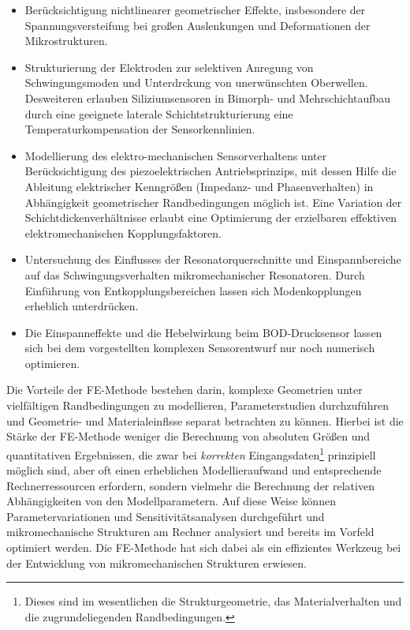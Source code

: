 \begin{itemize}
\item
Berücksichtigung nichtlinearer geometrischer Effekte, insbesondere der
Spannungsversteifung bei großen Auslenkungen und Deformationen der
Mikrostrukturen.
\item
Strukturierung der Elektroden zur selektiven Anregung von Schwingungsmoden
und Unterdrckung von unerwünschten Oberwellen. Desweiteren erlauben
Siliziumsensoren in Bimorph- und Mehrschichtaufbau durch eine geeignete
laterale Schichtstrukturierung eine Temperaturkompensation der
Sensorkennlinien.
\item
Modellierung des elektro-mechanischen Sensorverhaltens unter
Berücksichtigung des piezoelektrischen Antriebsprinzips, mit dessen
Hilfe die Ableitung elektrischer Kenngrößen (Impedanz- und Phasenverhalten)
in Abhängigkeit geometrischer Randbedingungen möglich ist. Eine Variation
der Schichtdickenverhältnisse erlaubt eine Optimierung der erzielbaren
effektiven elektromechanischen Kopplungsfaktoren.
\item
Untersuchung des Einflusses der Resonatorquerschnitte und Einspannbereiche
auf das Schwingungsverhalten mikromechanischer Resonatoren. Durch Einführung
von Entkopplungsbereichen lassen sich Modenkopplungen erheblich unterdrücken.
\item
Die Einspanneffekte und die Hebelwirkung beim BOD-Drucksensor lassen sich
bei dem vorgestellten komplexen Sensorentwurf nur noch numerisch
optimieren.
\end{itemize}
%
Die Vorteile der FE-Methode bestehen darin, komplexe Geometrien unter
vielfältigen Randbedingungen zu modellieren,
Parameterstudien durchzuführen und Geometrie- und Materialeinflsse
separat betrachten zu können. Hierbei ist die Stärke der FE-Methode
weniger die Berechnung von absoluten Größen und quantitativen Ergebnissen,
die zwar bei {\em korrekten} Eingangsdaten\footnote{Dieses sind im
wesentlichen die Strukturgeometrie, das Materialverhalten und die
zugrundeliegenden Randbedingungen.} prinzipiell möglich sind, aber oft
einen erheblichen Modellieraufwand und entsprechende Rechnerressourcen
erfordern, sondern vielmehr die Berechnung der relativen Abhängigkeiten
von den Modellparametern. Auf diese Weise können Parametervariationen und
Sensitivitätsanalysen durchgeführt und mikromechanische Strukturen am
Rechner analysiert und bereits im Vorfeld optimiert werden. Die FE-Methode
hat sich dabei als ein effizientes Werkzeug bei der Entwicklung von
mikromechanischen Strukturen erwiesen.\\
